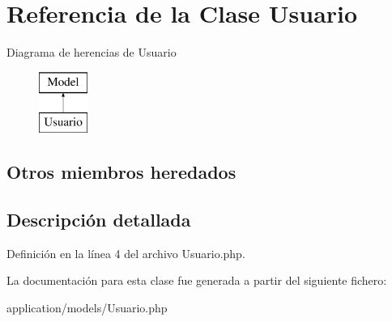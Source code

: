 \hypertarget{class_usuario}{}\section{Referencia de la Clase Usuario}
\label{class_usuario}
Diagrama de herencias de Usuario\begin{figure}[H]
\begin{center}
\leavevmode
\includegraphics[height=2.000000cm]{class_usuario}
\end{center}
\end{figure}
\subsection*{Otros miembros heredados}


\subsection{Descripción detallada}


Definición en la línea 4 del archivo Usuario.\+php.



La documentación para esta clase fue generada a partir del siguiente fichero\+:\begin{DoxyCompactItemize}
\item 
application/models/Usuario.\+php\end{DoxyCompactItemize}
